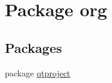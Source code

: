 \hypertarget{namespaceorg}{}\section{Package org}
\label{namespaceorg}
\subsection*{Packages}
\begin{DoxyCompactItemize}
\item 
package \hyperlink{namespaceorg_1_1qtproject}{qtproject}
\end{DoxyCompactItemize}
